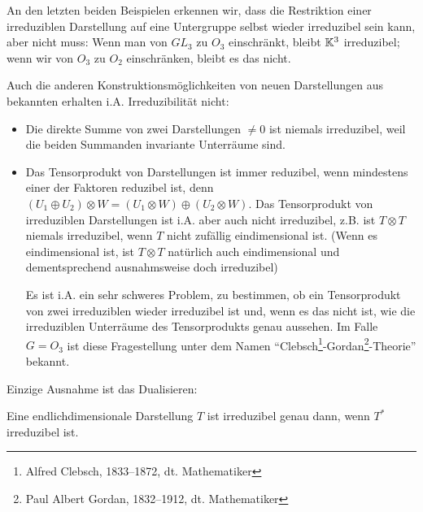 \begin{remark}
An den letzten beiden Beispielen erkennen wir, dass die Restriktion einer irreduziblen Darstellung auf eine Untergruppe selbst wieder irreduzibel sein kann, aber nicht muss: Wenn man von $GL_3$ zu $O_3$ einschränkt, bleibt $\mathbb{K}^3$ irreduzibel; wenn wir von $O_3$ zu $O_2$ einschränken, bleibt es das nicht.

Auch die anderen Konstruktionsmöglichkeiten von neuen Darstellungen aus bekannten erhalten i.A. Irreduzibilität nicht:
\begin{itemize}
\item Die direkte Summe von zwei Darstellungen $\neq 0$ ist niemals irreduzibel, weil die beiden Summanden invariante Unterräume sind.
\item Das Tensorprodukt von Darstellungen ist immer reduzibel, wenn mindestens einer der Faktoren reduzibel ist, denn $(U_1\oplus U_2)\otimes W = (U_1\otimes W) \oplus (U_2\otimes W)$. Das Tensorprodukt von irreduziblen Darstellungen ist i.A. aber auch nicht irreduzibel, z.B. ist $T\otimes T$ niemals irreduzibel, wenn $T$ nicht zufällig eindimensional ist. (Wenn es eindimensional ist, ist $T\otimes T$ natürlich auch eindimensional und dementsprechend ausnahmsweise doch irreduzibel)

Es ist i.A. ein sehr schweres Problem, zu bestimmen, ob ein Tensorprodukt von zwei irreduziblen wieder irreduzibel ist und, wenn es das nicht ist, wie die irreduziblen Unterräume des Tensorprodukts genau aussehen. Im Falle $G=O_3$ ist diese Fragestellung unter dem Namen \enquote{Clebsch\footnote{Alfred Clebsch, 1833--1872, dt. Mathematiker}-Gordan\footnote{Paul Albert Gordan, 1832--1912, dt. Mathematiker}-Theorie} bekannt.
\end{itemize}

Einzige Ausnahme ist das Dualisieren:
\end{remark}

\begin{lemma}
Eine endlichdimensionale Darstellung $T$ ist irreduzibel genau dann, wenn $T^\ast$ irreduzibel ist.
\end{lemma}
